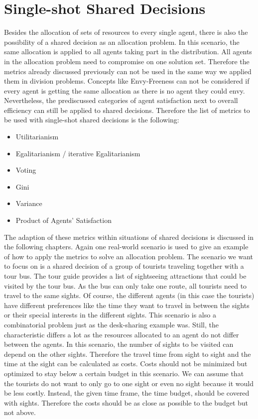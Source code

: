 \documentclass[german, a4paper, 11pt, oneside]{scrbook}
\begin{document}
\section{Single-shot Shared Decisions}
Besides the allocation of sets of resources to every single agent, there is also the possibility of a shared decision as an allocation problem. In this scenario, the same allocation is applied to all agents taking part in the distribution. All agents in the allocation problem need to compromise on one solution set. Therefore the metrics already discussed previously can not be used in the same way we applied them in division problems. Concepts like Envy-Freeness can not be considered if every agent is getting the same allocation as there is no agent they could envy. Nevertheless, the prediscussed categories of agent satisfaction next to overall efficiency can still be applied to shared decisions. Therefore the list of metrics to be used with single-shot shared decisions is the following:
\begin{itemize}
  \item Utilitarianism
  \item Egalitarianism / iterative Egalitarianism
  \item Voting
\item Gini
\item Variance
\item Product of Agents' Satisfaction
\end{itemize}
The adaption of these metrics within situations of shared decisions is discussed in the following chapters. Again one real-world scenario is used to give an example of how to apply the metrics to solve an allocation problem. The scenario we want to focus on is a shared decision of a group of tourists traveling together with a tour bus. The tour guide provides a list of sightseeing attractions that could be visited by the tour bus. As the bus can only take one route, all tourists need to travel to the same sights. Of course, the different agents (in this case the tourists) have different preferences like the time they want to travel in between the sights or their special interests in the different sights. This scenario is also a combinatorial problem just as the desk-sharing example was. Still, the characteristic differs a lot as the resources allocated to an agent do not differ between the agents. In this scenario, the number of sights to be visited can depend on the other sights. Therefore the travel time from sight to sight and the time at the sight can be calculated as costs. Costs should not be minimized but optimized to stay below a certain budget in this scenario. We can assume that the tourists do not want to only go to one sight or even no sight because it would be less costly. Instead, the given time frame, the time budget, should be covered with sights. Therefore the costs should be as close as possible to the budget but not above.
\end{document}
